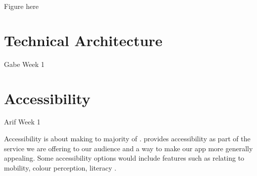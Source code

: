 

\newpage

Figure here

\newpage


\section{Technical Architecture}
Gabe Week 1

\section{Accessibility}
Arif Week 1

Accessibility is about making  to majority of .  provides accessibility as part of the service we are offering to our audience and a way to make our app more generally appealing. Some accessibility options would include features such as relating to mobility, colour perception,  literacy .

